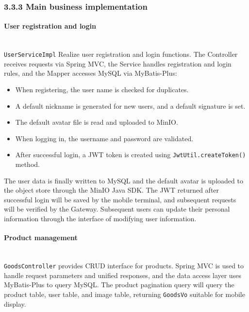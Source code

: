 \documentclass{article}
\begin{document}
\subsubsection{3.3.3 Main business implementation}

\paragraph{User registration and login}\mbox{}\\

\texttt{UserServiceImpl} Realize user registration and login functions. The Controller receives requests via Spring MVC, the Service handles registration and login rules, and the Mapper accesses MySQL via MyBatis-Plus:

\begin{itemize}
    \item When registering, the user name is checked for duplicates.
    \item A default nickname is generated for new users, and a default signature is set.
    \item The default avatar file is read and uploaded to MinIO.
    \item When logging in, the username and password are validated.
    \item After successful login, a JWT token is created using \texttt{JwtUtil.createToken()} method.
\end{itemize}

The user data is finally written to MySQL and the default avatar is uploaded to the object store through the MinIO Java SDK. The JWT returned after successful login will be saved by the mobile terminal, and subsequent requests will be verified by the Gateway. Subsequent users can update their personal information through the interface of modifying user information.

\paragraph{Product management}\mbox{}\\

\texttt{GoodsController} provides CRUD interface for products. Spring MVC is used to handle request parameters and unified responses, and the data access layer uses MyBatis-Plus to query MySQL. The product pagination query will query the product table, user table, and image table, returning \texttt{GoodsVo} suitable for mobile display.
\end{document}

